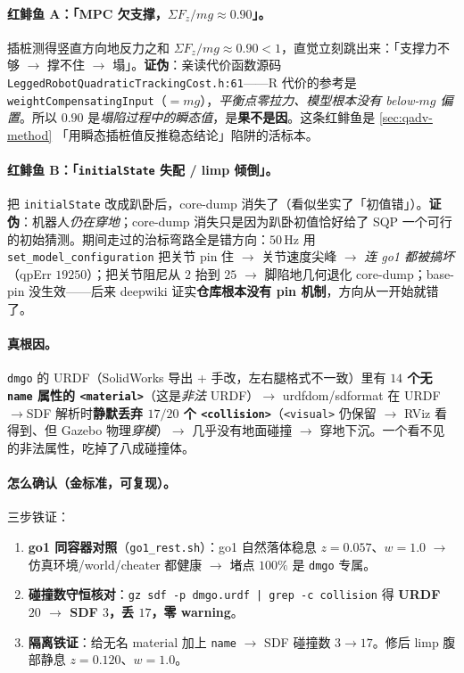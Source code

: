 \paragraph{红鲱鱼 A：「MPC 欠支撑，$\Sigma F_z/mg\approx0.90$」。}
插桩测得竖直方向地反力之和 $\Sigma F_z/mg\approx0.90<1$，直觉立刻跳出来：「支撑力不够 $\to$ 撑不住 $\to$ 塌」。\textbf{证伪}：亲读代价函数源码 \texttt{LeggedRobotQuadraticTrackingCost.\allowbreak h:61}——R 代价的参考是 \texttt{weightCompensatingInput}（$=mg$），\emph{平衡点零拉力、模型根本没有 below-$mg$ 偏置}。所以 $0.90$ 是\emph{塌陷过程中的瞬态值}，是\textbf{果不是因}。这条红鲱鱼是 \cref{sec:qadv-method} 「用瞬态插桩值反推稳态结论」陷阱的活标本。

\paragraph{红鲱鱼 B：「\texttt{initialState} 失配 / limp 倾倒」。}
把 \texttt{initialState} 改成趴卧后，core-dump 消失了（看似坐实了「初值错」）。\textbf{证伪}：机器人\emph{仍在穿地}；core-dump 消失只是因为趴卧初值恰好给了 SQP 一个可行的初始猜测。期间走过的治标弯路全是错方向：$50$\,Hz 用 \texttt{set\_model\_configuration} 把关节 pin 住 $\to$ 关节速度尖峰 $\to$ \emph{连 go1 都被搞坏}（qpErr $19250$）；把关节阻尼从 $2$ 抬到 $25$ $\to$ 脚陷地几何退化 core-dump；base-pin 没生效——后来 deepwiki 证实\textbf{仓库根本没有 pin 机制}，方向从一开始就错了。

\paragraph{真根因。}
\texttt{dmgo} 的 URDF（SolidWorks 导出 + 手改，左右腿格式不一致）里有 \textbf{$14$ 个无 \texttt{name} 属性的 \texttt{<material>}}（这是\emph{非法} URDF）$\to$ urdfdom/sdformat 在 URDF$\to$SDF 解析时\textbf{静默丢弃 $17/20$ 个 \texttt{<collision>}}（\texttt{<visual>} 仍保留 $\to$ RViz 看得到、但 Gazebo 物理\emph{穿模}）$\to$ 几乎没有地面碰撞 $\to$ 穿地下沉。一个看不见的非法属性，吃掉了八成碰撞体。

\paragraph{怎么确认（金标准，可复现）。}
三步铁证：
\begin{enumerate}
  \item \textbf{go1 同容器对照}（\texttt{go1\_rest.\allowbreak sh}）：go1 自然落体稳息 $z{=}0.057$、$w{=}1.0$ $\to$ 仿真环境/world/cheater 都健康 $\to$ 堵点 $100\%$ 是 \texttt{dmgo} 专属。
  \item \textbf{碰撞数守恒核对}：\texttt{gz sdf -p dmgo.\allowbreak urdf | grep -c collision} 得 \textbf{URDF $20$ $\to$ SDF $3$，丢 $17$，零 warning}。
  \item \textbf{隔离铁证}：给无名 material 加上 \texttt{name} $\to$ SDF 碰撞数 \textbf{$3\to17$}。修后 limp 腹部静息 $z{=}0.120$、$w{=}1.0$。
\end{enumerate}

